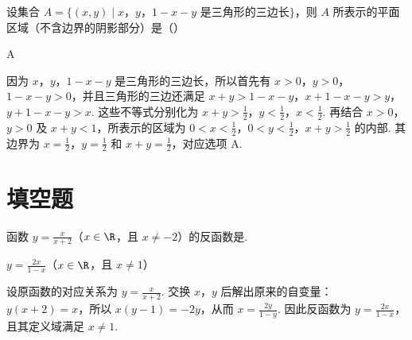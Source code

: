 \begin{problem}
设集合 \(A = \{(x,y)\mid x\)，\(y\)，\(1-x-y\) 是三角形的三边长\(\}\)，则 \(A\) 所表示的平面区域（不含边界的阴影部分）是（\quad）

    {}
    {}
    {}

\begin{answer}
A
\end{answer}

\begin{solution}
因为 \(x\)，\(y\)，\(1-x-y\) 是三角形的三边长，所以首先有
\(x>0\)，\(y>0\)，\(1-x-y>0\)，并且三角形的三边还满足
\(x+y>1-x-y\)，\(x+1-x-y>y\)，\(y+1-x-y>x\).
这些不等式分别化为
\(x+y>\frac{1}{2}\)，\(y<\frac{1}{2}\)，\(x<\frac{1}{2}\). 再结合 \(x>0\)，\(y>0\) 及 \(x+y<1\)，所表示的区域为
\(0<x<\frac{1}{2}\)，\(0<y<\frac{1}{2}\)，\(x+y>\frac{1}{2}\) 的内部. 其边界为 \(x=\frac{1}{2}\)，\(y=\frac{1}{2}\) 和 \(x+y=\frac{1}{2}\)，对应选项 A.
\end{solution}
\end{problem}

\section{填空题}
\begin{problem}
函数 \( y = \frac{x}{x + 2} \)（\(x \in \R\)，且 \(x \neq -2\)）的反函数是\fillinblank{}.

\begin{answer}
\(y=\frac{2x}{1-x}\)（\(x\in\R\)，且 \(x\neq1\)）
\end{answer}

\begin{solution}
设原函数的对应关系为 \(y=\frac{x}{x+2}\). 交换 \(x\)，\(y\) 后解出原来的自变量：
\(y(x+2)=x\)，所以 \(x(y-1)=-2y\)，从而 \(x=\frac{2y}{1-y}\). 因此反函数为 \(y=\frac{2x}{1-x}\)，且其定义域满足 \(x\neq1\).
\end{solution}
\end{problem}


